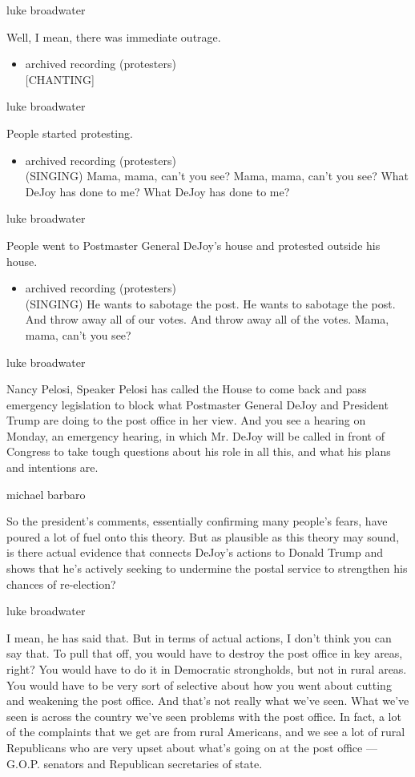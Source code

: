luke broadwater

Well, I mean, there was immediate outrage.

\begin{itemize}
\tightlist
\item
  archived recording (protesters)\\
  {[}CHANTING{]}
\end{itemize}

luke broadwater

People started protesting.

\begin{itemize}
\tightlist
\item
  archived recording (protesters)\\
  (SINGING) Mama, mama, can't you see? Mama, mama, can't you see? What
  DeJoy has done to me? What DeJoy has done to me?
\end{itemize}

luke broadwater

People went to Postmaster General DeJoy's house and protested outside
his house.

\begin{itemize}
\tightlist
\item
  archived recording (protesters)\\
  (SINGING) He wants to sabotage the post. He wants to sabotage the
  post. And throw away all of our votes. And throw away all of the
  votes. Mama, mama, can't you see?
\end{itemize}

luke broadwater

Nancy Pelosi, Speaker Pelosi has called the House to come back and pass
emergency legislation to block what Postmaster General DeJoy and
President Trump are doing to the post office in her view. And you see a
hearing on Monday, an emergency hearing, in which Mr. DeJoy will be
called in front of Congress to take tough questions about his role in
all this, and what his plans and intentions are.

michael barbaro

So the president's comments, essentially confirming many people's fears,
have poured a lot of fuel onto this theory. But as plausible as this
theory may sound, is there actual evidence that connects DeJoy's actions
to Donald Trump and shows that he's actively seeking to undermine the
postal service to strengthen his chances of re-election?

luke broadwater

I mean, he has said that. But in terms of actual actions, I don't think
you can say that. To pull that off, you would have to destroy the post
office in key areas, right? You would have to do it in Democratic
strongholds, but not in rural areas. You would have to be very sort of
selective about how you went about cutting and weakening the post
office. And that's not really what we've seen. What we've seen is across
the country we've seen problems with the post office. In fact, a lot of
the complaints that we get are from rural Americans, and we see a lot of
rural Republicans who are very upset about what's going on at the post
office --- G.O.P. senators and Republican secretaries of state.

